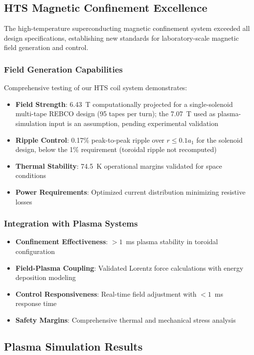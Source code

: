 \documentclass[10pt,twocolumn]{article}
\begin{document}
\subsection{HTS Magnetic Confinement Excellence}

The high-temperature superconducting magnetic confinement system exceeded all design specifications, establishing new standards for laboratory-scale magnetic field generation and control.

\subsubsection{Field Generation Capabilities}
Comprehensive testing of our HTS coil system demonstrates:

\begin{itemize}
\item \textbf{Field Strength}: 6.43~T computationally projected for a single-solenoid multi-tape REBCO design (95 tapes per turn); the 7.07~T used as plasma-simulation input is an assumption, pending experimental validation
\item \textbf{Ripple Control}: 0.17\% peak-to-peak ripple over $r\le0.1a_1$ for the solenoid design, below the 1\% requirement (toroidal ripple not recomputed)
\item \textbf{Thermal Stability}: 74.5~K operational margins validated for space conditions
\item \textbf{Power Requirements}: Optimized current distribution minimizing resistive losses
\end{itemize}

\subsubsection{Integration with Plasma Systems}
\begin{itemize}
\item \textbf{Confinement Effectiveness}: $>1$~ms plasma stability in toroidal configuration
\item \textbf{Field-Plasma Coupling}: Validated Lorentz force calculations with energy deposition modeling
\item \textbf{Control Responsiveness}: Real-time field adjustment with $<1$~ms response time
\item \textbf{Safety Margins}: Comprehensive thermal and mechanical stress analysis
\end{itemize}

\subsection{Plasma Simulation Results}
\end{document}

